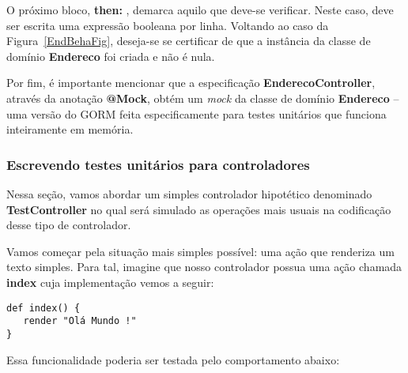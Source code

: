\vspace{0.2cm}

O próximo bloco, {\bf then:} , demarca aquilo que deve-se verificar. Neste caso,
deve  ser  escrita  uma  expressão  booleana  por linha.  Voltando  ao  caso  da
Figura~\ref{EndBehaFig}, deseja-se se certificar de que a instância da classe de
domínio {\bf Endereco} foi criada e não é nula.

\vspace{0.2cm}

Por fim,  é importante mencionar  que a especificação  {\bf EnderecoController},
através da anotação  {\bf @Mock}, obtém um {\it mock} da  classe de domínio {\bf
  Endereco} --  uma versão do  GORM feita especificamente para  testes unitários
que funciona inteiramente em memória.

\subsubsection{Escrevendo testes unitários para controladores}

\vspace{0.2cm}

Nessa  seção, vamos abordar  um simples  controlador hipotético  denominado {\bf
  TestController} no qual será simulado  as operações mais usuais na codificação
desse tipo de controlador.

\vspace{0.2cm}

  Vamos começar pela situação mais simples
possível: uma ação  que renderiza um texto simples. Para  tal, imagine que nosso
controlador  possua uma  ação chamada  {\bf  index} cuja  implementação vemos  a
seguir: 

\vspace{0.2cm}

\begin{mdframed}
\begin{footnotesize}
\begin{verbatim}
def index() {
   render "Olá Mundo !"
}
\end{verbatim}
\end{footnotesize}
\end{mdframed}

\vspace{0.1cm}

Essa funcionalidade poderia ser testada pelo comportamento abaixo:

\vspace{0.1cm}

